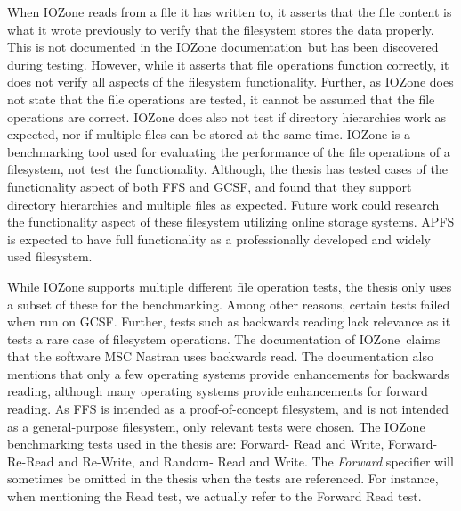 When IOZone reads from a file it has written to, it asserts that the file content is what it wrote previously to verify that the filesystem stores the data properly. This is not documented in the IOZone documentation\,\cite{iozoneIozoneFilesystemBenchmark} but has been discovered during testing. However, while it asserts that file operations function correctly, it does not verify all aspects of the filesystem functionality. Further, as IOZone does not state that the file operations are tested, it cannot be assumed that the file operations are correct. IOZone does also not test if directory hierarchies work as expected, nor if multiple files can be stored at the same time. IOZone is a benchmarking tool used for evaluating the performance of the file operations of a filesystem, not test the functionality. Although, the thesis has tested cases of the functionality aspect of both FFS and GCSF, and found that they support directory hierarchies and multiple files as expected. Future work could research the functionality aspect of these filesystem utilizing online storage systems. APFS is expected to have full functionality as a professionally developed and widely used filesystem.

While IOZone supports multiple different file operation tests, the thesis only uses a subset of these for the benchmarking. Among other reasons, certain tests failed when run on GCSF. Further, tests such as backwards reading lack relevance as it tests a rare case of filesystem operations. The documentation of IOZone\,\cite{iozoneIozoneFilesystemBenchmark} claims that the software MSC Nastran uses backwards read. The documentation also mentions that only a few operating systems provide enhancements for backwards reading, although many operating systems provide enhancements for forward reading. As FFS is intended as a proof-of-concept filesystem, and is not intended as a general-purpose filesystem, only relevant tests were chosen. The IOZone benchmarking tests used in the thesis are: Forward- Read and Write, Forward- Re-Read and Re-Write, and Random- Read and Write. The \textit{Forward} specifier will sometimes be omitted in the thesis when the tests are referenced. For instance, when mentioning the Read test, we actually refer to the Forward Read test.

